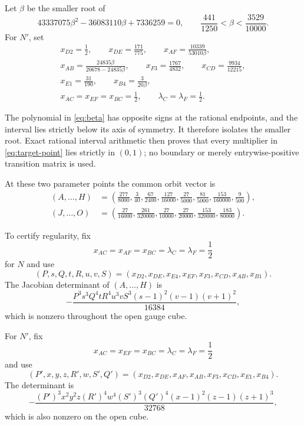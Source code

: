 \documentclass[11pt]{article}
\theoremstyle{remark}
\begin{document}
Let $\beta$ be the smaller root of
\begin{equation}\label{eq:beta}
43337075\beta^2-36083110\beta+7336259=0,
\qquad
\frac{441}{1250}<\beta<\frac{3529}{10000}.
\end{equation}
For $N'$, set
\begin{equation}\label{eq:target-point}
\begin{gathered}
x_{D2}=\frac12,\qquad x_{DE}=\frac{171}{775},
\qquad x_{AF}=\frac{10339}{53010\beta},\\
x_{AB}=\frac{24835\beta}{20678-24835\beta},
\qquad x_{F3}=\frac{1767}{4832},
\qquad x_{CD}=\frac{9934}{12215},\\
x_{E1}=\frac{31}{190},\qquad x_{B4}=\frac{3}{20\beta},\\
x_{AC}=x_{EF}=x_{BC}=\frac12,\qquad
\lambda_C=\lambda_F=\frac12.
\end{gathered}
\end{equation}

The polynomial in \eqref{eq:beta} has opposite signs at the rational
endpoints, and the interval lies strictly below its axis of symmetry.  It
therefore isolates the smaller root.  Exact rational interval arithmetic
then proves that every multiplier in \eqref{eq:target-point} lies strictly in
$(0,1)$; no boundary or merely entrywise-positive transition matrix is used.

At these two parameter points the common orbit vector is
\begin{align}
(A,\ldots,H)&=
\left(
\frac{277}{8000},\frac3{40},\frac{67}{2400},\frac{127}{16000},
\frac{27}{5000},\frac{81}{5000},\frac{153}{160000},\frac9{500}
\right),\label{eq:first-eight}\\
(J,\ldots,O)&=
\left(
\frac{27}{16000},\frac{261}{320000},\frac{27}{10000},
\frac{27}{20000},\frac{153}{320000},\frac{183}{80000}
\right).
\label{eq:last-six}
\end{align}

To certify regularity, fix
\[
x_{AC}=x_{AF}=x_{BC}=\lambda_C=\lambda_F=\frac12
\]
for $N$ and use
\[
(P,s,Q,t,R,u,v,S)=
(x_{D2},x_{DE},x_{E4},x_{EF},x_{F3},x_{CD},x_{AB},x_{B1}).
\]
The Jacobian determinant of $(A,\ldots,H)$ is
\begin{equation}\label{eq:source-jac}
-\frac{P^3s^3Q^4tR^4u^3vS^3(s-1)^2(v-1)(v+1)^2}{16384},
\end{equation}
which is nonzero throughout the open gauge cube.

For $N'$, fix
\[
x_{AC}=x_{EF}=x_{BC}=\lambda_C=\lambda_F=\frac12
\]
and use
\[
(P',x,y,z,R',w,S',Q')=
(x_{D2},x_{DE},x_{AF},x_{AB},x_{F3},x_{CD},x_{E1},x_{B4}).
\]
The determinant is
\begin{equation}\label{eq:target-jac}
-\frac{(P')^3x^2y^2z(R')^4w^4(S')^3(Q')^4
(x-1)^2(z-1)(z+1)^3}{32768},
\end{equation}
which is also nonzero on the open cube.
\end{document}
